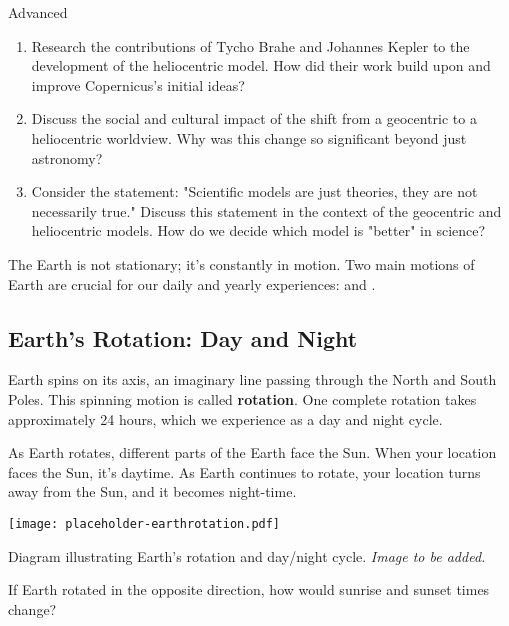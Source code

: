 \begin{tieredquestions}{Advanced}
\begin{enumerate}
    \item Research the contributions of Tycho Brahe and Johannes Kepler to the development of the heliocentric model. How did their work build upon and improve Copernicus's initial ideas?
    \item Discuss the social and cultural impact of the shift from a geocentric to a heliocentric worldview. Why was this change so significant beyond just astronomy?
    \item  Consider the statement: "Scientific models are just theories, they are not necessarily true."  Discuss this statement in the context of the geocentric and heliocentric models. How do we decide which model is "better" in science?
\end{enumerate}
\end{tieredquestions}


\FloatBarrier

The Earth is not stationary; it's constantly in motion.  Two main motions of Earth are crucial for our daily and yearly experiences:  and .

\subsection{Earth's Rotation: Day and Night}

Earth spins on its axis, an imaginary line passing through the North and South Poles. This spinning motion is called \textbf{rotation}. One complete rotation takes approximately 24 hours, which we experience as a day and night cycle.

As Earth rotates, different parts of the Earth face the Sun. When your location faces the Sun, it's daytime. As Earth continues to rotate, your location turns away from the Sun, and it becomes night-time.

\begin{marginfigure}
\texttt{[image: placeholder-earthrotation.pdf]}
\caption{\label{fig:earthrotation}Diagram illustrating Earth's rotation and day/night cycle. \textit{Image to be added.}}
\end{marginfigure}

\begin{stopandthink}
If Earth rotated in the opposite direction, how would sunrise and sunset times change?
\end{stopandthink}


